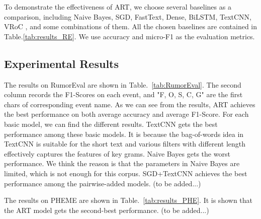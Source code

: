 To demonstrate the effectiveness of ART, we choose several baselines as a comparison, including Naive Bayes, SGD, FastText, Dense, BiLSTM, TextCNN, VRoC \cite{DBLP:conf/www/ChengNB20}, and some combinations of them. All the chosen baselines are contained in Table.\ref{tab:results_RE}. We use accuracy and micro-F1 as the evaluation metrics.


\subsection{Experimental Results}
The results on RumorEval are shown in Table.~{\ref{tab:RumorEval}}. The second column records the F1-Scores on each event, and "F, O, S, C, G" are the first chars of corresponding event name. As we can see from the results, ART achieves the best performance on both average accuracy and average F1-Score. For each basic model, we can find the different results. TextCNN gets the best performance among these basic models. It is because the bag-of-words idea in TextCNN is suitable for the short text and various filters with different length effectively captures the features of key grams. Naive Bayes gets the worst performance. We think the reason is that the parameters in Naive Bayes are limited, which is not enough for this corpus. SGD+TextCNN achieves the best performance among the pairwise-added models. (to be added...)

The results on PHEME are shown in Table.~\ref{tab:results_PHE}. It is shown that the ART model gets the second-best performance. (to be added...)

